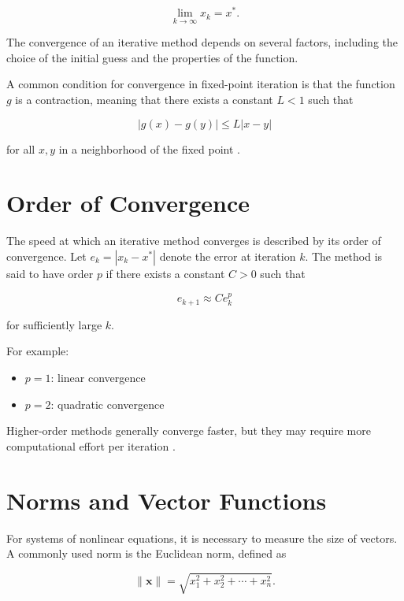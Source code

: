\begin{equation}
\lim_{k \to \infty} x_k = x^*.
\end{equation}

The convergence of an iterative method depends on several factors, including the choice of the initial guess and the properties of the function.

A common condition for convergence in fixed-point iteration is that the function \( g \) is a contraction, meaning that there exists a constant \( L < 1 \) such that

\begin{equation}
|g(x) - g(y)| \leq L |x - y|
\end{equation}

for all \( x, y \) in a neighborhood of the fixed point \cite{burden, cs357}.

\section{Order of Convergence}

The speed at which an iterative method converges is described by its order of convergence. Let \( e_k = |x_k - x^*| \) denote the error at iteration \( k \). The method is said to have order \( p \) if there exists a constant \( C > 0 \) such that

\begin{equation}
e_{k+1} \approx C e_k^p
\end{equation}

for sufficiently large \( k \).

For example:
\begin{itemize}
    \item \( p = 1 \): linear convergence
    \item \( p = 2 \): quadratic convergence
\end{itemize}

Higher-order methods generally converge faster, but they may require more computational effort per iteration \cite{burden}.

\section{Norms and Vector Functions}

For systems of nonlinear equations, it is necessary to measure the size of vectors. A commonly used norm is the Euclidean norm, defined as

\begin{equation}
\|\mathbf{x}\| = \sqrt{x_1^2 + x_2^2 + \cdots + x_n^2}.
\end{equation}

